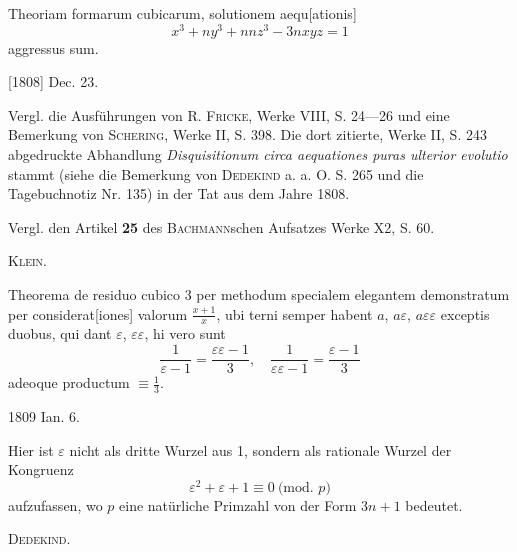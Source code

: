 \noindent\hspace*{\parindent}Theoriam formarum cubicarum, solutionem aequ[ationis]
\[
x^3+ny^3+nnz^3-3nxyz=1
\]
\noindent aggressus sum.
\par\noindent\hfill [1808] Dec. 23.
\par\medskip\begingroup\small
\noindent\hspace*{\parindent}Vergl. die Ausführungen von R. \textsc{Fricke}, Werke VIII, S. 24—26 und eine Bemerkung von \textsc{Schering}, Werke II, S. 398. Die dort zitierte, Werke II, S. 243 abgedruckte Abhandlung \textit{Disquisitionum circa aequationes puras ulterior evolutio} stammt (siehe die Bemerkung von \textsc{Dedekind} a. a. O. S. 265 und die Tagebuchnotiz Nr. 135) in der Tat aus dem Jahre 1808.
\par\noindent\hspace*{\parindent}Vergl. den Artikel \textbf{25} des \textsc{Bachmann}schen Aufsatzes Werke X2, S. 60.
\par\noindent\hfill\textsc{Klein.}
\par\endgroup

\noindent\hspace*{\parindent}Theorema de residuo cubico 3 per methodum specialem elegantem demonstratum per considerat[iones] valorum \(\frac{x+1}{x}\), ubi terni semper habent \(a\), \(a\varepsilon\), \(a\varepsilon\varepsilon\) exceptis duobus, qui dant \(\varepsilon\), \(\varepsilon\varepsilon\), hi vero sunt
\[
\frac{1}{\varepsilon-1}=\frac{\varepsilon\varepsilon-1}{3},\quad
\frac{1}{\varepsilon\varepsilon-1}=\frac{\varepsilon-1}{3}
\]
\noindent adeoque productum \(\equiv\frac{1}{3}\).
\par\noindent\hfill 1809 Ian. 6.
\par\medskip\begingroup\small
\noindent\hspace*{\parindent}Hier ist \(\varepsilon\) nicht als dritte Wurzel aus 1, sondern als rationale Wurzel der Kongruenz
\[
\varepsilon^2+\varepsilon+1\equiv0\ \text{(mod.\ }p\text{)}
\]
\noindent aufzufassen, wo \(p\) eine natürliche Primzahl von der Form \(3n+1\) bedeutet.
\par\noindent\hfill\textsc{Dedekind.}
\par\endgroup
